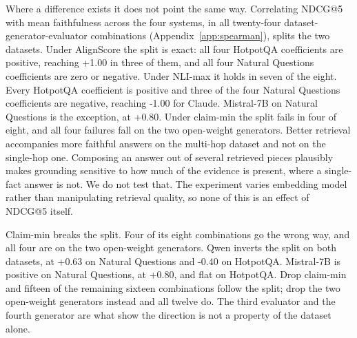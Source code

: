 \label{sec:direction}

Where a difference exists it does not point the same way. Correlating NDCG@5 with mean faithfulness across the four systems, in all twenty-four dataset-generator-evaluator combinations (Appendix~\ref{app:spearman}), splits the two datasets. Under AlignScore the split is exact: all four HotpotQA coefficients are positive, reaching +1.00 in three of them, and all four Natural Questions coefficients are zero or negative. Under NLI-max it holds in seven of the eight. Every HotpotQA coefficient is positive and three of the four Natural Questions coefficients are negative, reaching -1.00 for Claude. Mistral-7B on Natural Questions is the exception, at +0.80. Under claim-min the split fails in four of eight, and all four failures fall on the two open-weight generators. Better retrieval accompanies more faithful answers on the multi-hop dataset and not on the single-hop one. Composing an answer out of several retrieved pieces plausibly makes grounding sensitive to how much of the evidence is present, where a single-fact answer is not. We do not test that. The experiment varies embedding model rather than manipulating retrieval quality, so none of this is an effect of NDCG@5 itself.

Claim-min breaks the split. Four of its eight combinations go the wrong way, and all four are on the two open-weight generators. Qwen inverts the split on both datasets, at +0.63 on Natural Questions and -0.40 on HotpotQA. Mistral-7B is positive on Natural Questions, at +0.80, and flat on HotpotQA. Drop claim-min and fifteen of the remaining sixteen combinations follow the split; drop the two open-weight generators instead and all twelve do. The third evaluator and the fourth generator are what show the direction is not a property of the dataset alone.

